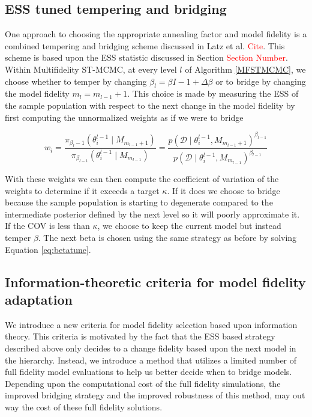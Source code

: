 \documentclass[1p]{article}
\begin{document}
\subsection{ESS tuned tempering and bridging}

One approach to choosing the appropriate annealing factor and model fidelity is a combined tempering and bridging scheme discussed in Latz et al. \textcolor{red}{Cite}. This scheme is based upon the ESS statistic discussed in Section \textcolor{red}{Section Number}. Within Multifidelity ST-MCMC, at every level $l$ of Algorithm \ref{MFSTMCMC}, we choose whether to temper by changing $\beta_l = \beta{I-1}+\Delta \beta$ or to bridge by changing the model fidelity $m_l = m_{l-1} + 1$. This choice is made by measuring the ESS of the sample population with respect to the next change in the model fidelity by first computing the unnormalized weights as if we were to bridge

\begin{equation}
w_i = \frac{\pi_{\beta_l-1} \left ( \theta_i^{l-1} \mid M_{m_{l-1}+1}\right )}{\pi_{\beta_{l-1}} \left ( \theta_i^{l-1} \mid M_{m_{l-1}} \right )} = \frac{p \left ( \mathcal{D} \mid \theta_i^{l-1},  M_{m_{l-1}+1} \right )^{\beta_{l-1}} }{p \left ( \mathcal{D} \mid \theta_i^{l-1},  M_{m_{l-1}} \right )^{\beta_{l-1}} }
\end{equation}

With these weights we can then compute the coefficient of variation of the weights to determine if it exceeds a target $\kappa$. If it does we choose to bridge because the sample population is starting to degenerate compared to the intermediate posterior defined by the next level so it will poorly approximate it. If the COV is less than $\kappa$, we choose to keep the current model but instead temper $\beta$. The next beta is chosen using the same strategy as before by solving Equation \ref{eq:betatune}.

\subsection{Information-theoretic criteria for model fidelity adaptation}
We introduce a new criteria for model fidelity selection based upon information theory. This criteria is motivated by the fact that the ESS based strategy described above only decides to a change fidelity based upon the next model in the hierarchy. Instead, we introduce a method that utilizes a limited number of full fidelity model evaluations to help us better decide when to bridge models. Depending upon the computational cost of the full fidelity simulations, the improved bridging strategy and the improved robustness of this method, may out way the cost of these full fidelity solutions.
\end{document}

